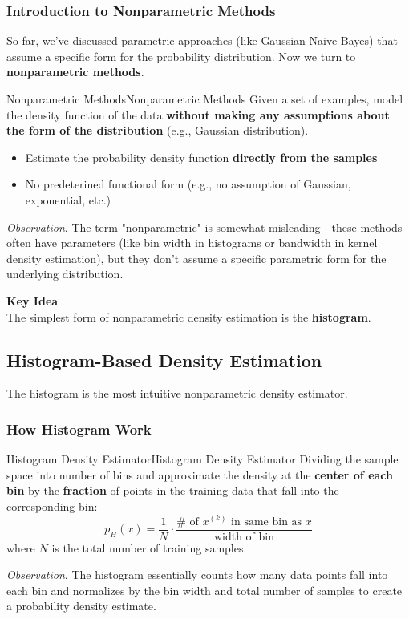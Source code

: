 \documentclass[a4paper]{article}
\theoremstyle{definition}
\begin{document}
\subsubsection{Introduction to Nonparametric Methods}
So far, we've discussed parametric approaches (like Gaussian Naive Bayes) that assume a specific form for the probability distribution. Now we turn
to \textbf{nonparametric methods}.
\begin{definition}{Nonparametric Methods}{Nonparametric Methods}
Given a set of examples, model the density function of the data \textbf{without making any assumptions about the form of the distribution} (e.g., Gaussian
distribution).
\begin{itemize}
    \item Estimate the probability density function \textbf{directly from the samples}
    \item No predeterined functional form (e.g., no assumption of Gaussian, exponential, etc.)
\end{itemize}
\end{definition}
\textit{Observation}. The term "nonparametric" is somewhat misleading - these methods often have parameters (like bin width in histograms or 
bandwidth in kernel density estimation), but they don't assume a specific parametric form for the underlying distribution.
\begin{tcolorbox}[
    colback=magenta!15!white,
    colframe=magenta!15!white,
    boxrule=0pt,
    arc=0pt,
    halign=center
]
    \textbf{Key Idea}\\[0.5em]
    The simplest form of nonparametric density estimation is the \textbf{histogram}.
\end{tcolorbox}
\subsection{Histogram-Based Density Estimation}
The histogram is the most intuitive nonparametric density estimator.
\subsubsection{How Histogram Work}
\begin{definition}{Histogram Density Estimator}{Histogram Density Estimator}
Dividing the sample space into number of bins and approximate the density at the \textbf{center of each bin} by the \textbf{fraction} of points in the 
training data that fall into the corresponding bin:
\[
  p_H(x) = \frac{1}{N} \cdot \frac{\# \text{ of } x^{(k)} \text{ in same bin as } x}{\text{width of bin}}
\]  
where \( N \) is the total number of training samples.
\end{definition}
\textit{Observation}. The histogram essentially counts how many data points fall into each bin and normalizes by the bin width and total number of samples to 
create a probability density estimate.
\end{document}
